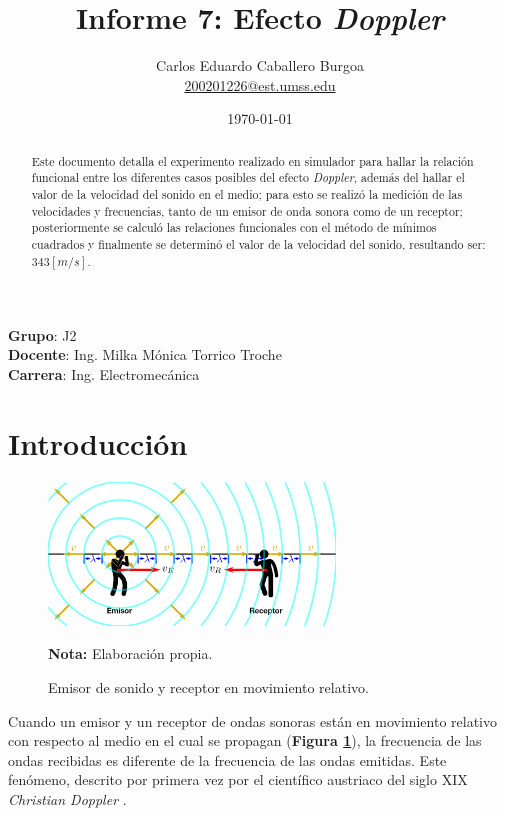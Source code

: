 \documentclass[letter,11pt]{article}
\title{Informe 7: Efecto \emph{Doppler}}
\author{Carlos Eduardo Caballero Burgoa \\
    \small{\href{mailto:200201226@est.umss.edu}{200201226@est.umss.edu}}
}
\date{\today}
\newcommand{\source}[1]{\vspace{-11pt} \caption*{\small{\textbf{Nota:} {#1}}}}
\begin{document}
\maketitle
\begin{center}
    \textbf{Grupo}: J2\\
    \textbf{Docente}: Ing. Milka Mónica Torrico Troche\\
    \textbf{Carrera}: Ing. Electromecánica
\end{center}

\begin{abstract}
Este documento detalla el experimento realizado en simulador para hallar la
relación funcional entre los diferentes casos posibles del efecto
\emph{Doppler}, además del hallar el valor de la velocidad del sonido en el
medio; para esto se realizó la medición de las velocidades y frecuencias, tanto
de un emisor de onda sonora como de un receptor; posteriormente se calculó las
relaciones funcionales con el método de mínimos cuadrados y finalmente se
determinó el valor de la velocidad del sonido, resultando ser: $343 [m/s]$.
\end{abstract}

\section{Introducción}

\begin{figure}
\centering
\includegraphics[width=0.68\textwidth]{resources/f1.eps}
\caption{Emisor de sonido y receptor en movimiento relativo.}
\label{figura1}
\source{Elaboración propia.}
\end{figure}

Cuando un emisor y un receptor de ondas sonoras están en movimiento relativo con
respecto al medio en el cual se propagan (\textbf{Figura \ref{figura1}}), la
frecuencia de las ondas recibidas es diferente de la frecuencia de las ondas
emitidas. Este fenómeno, descrito por primera vez por el científico austriaco
del siglo XIX \emph{Christian Doppler} \cite{Young&Freedman}.
\end{document}
